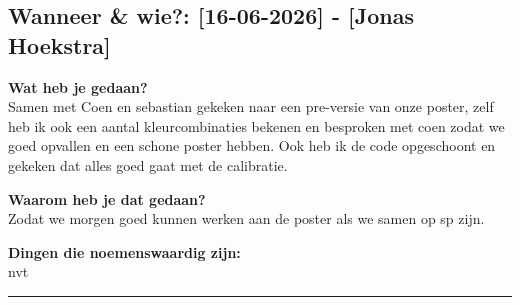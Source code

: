 
\subsection*{Wanneer \& wie?: [16-06-2026] - [Jonas Hoekstra]}

\textbf{Wat heb je gedaan?}\\
Samen met Coen en sebastian gekeken naar een pre-versie van onze poster, zelf heb ik ook een aantal kleurcombinaties bekenen en besproken met coen zodat we goed opvallen en een schone poster hebben. Ook heb ik de code opgeschoont en gekeken dat alles goed gaat met de calibratie.
\vspace{0.3cm} 

\noindent \textbf{Waarom heb je dat gedaan?}\\
Zodat we morgen goed kunnen werken aan de poster als we samen op sp zijn.

\noindent \textbf{Dingen die noemenswaardig zijn:}\\
nvt


\vspace{0.5cm}
\hrule 
\vspace{0.5cm}
